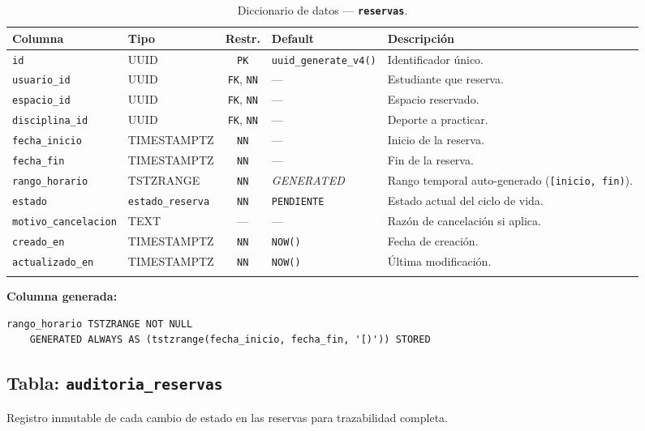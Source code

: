 \documentclass[12pt, a4paper]{article}
\newcommand{\pk}{\texttt{PK}}
\newcommand{\fk}{\texttt{FK}}
\newcommand{\nn}{\texttt{NN}}
\newcommand{\tname}[1]{\texttt{\textbf{#1}}}
\newcommand{\cname}[1]{\texttt{#1}}
\begin{document}
\begin{longtable}{l l c l p{4.2cm}}
    \toprule
    \textbf{Columna} & \textbf{Tipo} & \textbf{Restr.} & \textbf{Default} & \textbf{Descripción} \\
    \midrule
    \endhead
    \cname{id} & UUID & \pk & \texttt{uuid\_generate\_v4()} & Identificador único. \\
    \cname{usuario\_id} & UUID & \fk, \nn & --- & Estudiante que reserva. \\
    \cname{espacio\_id} & UUID & \fk, \nn & --- & Espacio reservado. \\
    \cname{disciplina\_id} & UUID & \fk, \nn & --- & Deporte a practicar. \\
    \cname{fecha\_inicio} & TIMESTAMPTZ & \nn & --- & Inicio de la reserva. \\
    \cname{fecha\_fin} & TIMESTAMPTZ & \nn & --- & Fin de la reserva. \\
    \cname{rango\_horario} & TSTZRANGE & \nn & \textit{GENERATED} & Rango temporal auto-generado (\texttt{[inicio, fin)}). \\
    \cname{estado} & \texttt{estado\_reserva} & \nn & \texttt{PENDIENTE} & Estado actual del ciclo de vida. \\
    \cname{motivo\_cancelacion} & TEXT & --- & --- & Razón de cancelación si aplica. \\
    \cname{creado\_en} & TIMESTAMPTZ & \nn & \texttt{NOW()} & Fecha de creación. \\
    \cname{actualizado\_en} & TIMESTAMPTZ & \nn & \texttt{NOW()} & Última modificación. \\
    \bottomrule
    \caption{Diccionario de datos --- \tname{reservas}.}
\end{longtable}

\textbf{Columna generada:}
\begin{lstlisting}[caption={Rango temporal generado automáticamente.}]
rango_horario TSTZRANGE NOT NULL
    GENERATED ALWAYS AS (tstzrange(fecha_inicio, fecha_fin, '[)')) STORED
\end{lstlisting}

\subsection{Tabla: \tname{auditoria\_reservas}}

Registro inmutable de cada cambio de estado en las reservas para trazabilidad completa.
\end{document}
